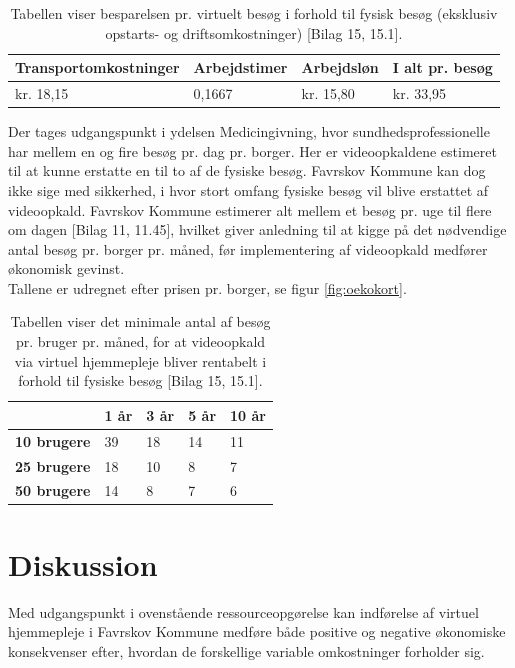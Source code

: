 \begin{table}[H]
	\caption{Tabellen viser besparelsen pr. virtuelt besøg i forhold til fysisk besøg (eksklusiv opstarts- og driftsomkostninger) [Bilag 15, 15.1].}
	\centering
	\label{tab:tabelbesparelse}
	\begin{tabular}{|l|l|l|l|}
		\hline
		\textbf{Transportomkostninger} & \textbf{Arbejdstimer } & \textbf{Arbejdsløn \cite{foa}} & \textbf{I alt pr. besøg}\\ \hline
		kr. 18,15 & 0,1667 & kr. 15,80 & kr. 33,95\\ \hline
	\end{tabular}
\end{table}

Der tages udgangspunkt i ydelsen Medicingivning, hvor sundhedsprofessionelle har mellem en og fire besøg pr. dag pr. borger. Her er videoopkaldene estimeret til at kunne erstatte en til to af de fysiske besøg. Favrskov Kommune kan dog ikke sige med sikkerhed, i hvor stort omfang fysiske besøg vil blive erstattet af videoopkald. Favrskov Kommune estimerer alt mellem et besøg pr. uge til flere om dagen [Bilag 11, 11.45], hvilket giver anledning til at kigge på det nødvendige antal besøg pr. borger pr. måned, før implementering af videoopkald medfører økonomisk gevinst.\\
Tallene er udregnet efter prisen pr. borger, se figur \ref{fig:oekokort}.

\begin{table}[H]
	\caption{Tabellen viser det minimale antal af besøg pr. bruger pr. måned, for at videoopkald via virtuel hjemmepleje bliver rentabelt i forhold til fysiske besøg [Bilag 15, 15.1].}
	\centering
	\label{tab:tabelminimum}
	\begin{tabular}{|l|l|l|l|l|}
		\hline
		 & \textbf{1 år} & \textbf{3 år} & \textbf{5 år} & \textbf{10 år}\\ \hline
		\textbf{10 brugere} & 39 & 18 & 14 & 11\\ \hline
		\textbf{25 brugere} & 18 & 10 & 8 & 7\\ \hline
		\textbf{50 brugere} & 14 & 8 & 7 & 6\\ \hline
	\end{tabular}
\end{table}

\section{Diskussion}
Med udgangspunkt i ovenstående ressourceopgørelse kan indførelse af virtuel hjemmepleje i Favrskov Kommune medføre både positive og negative økonomiske konsekvenser efter, hvordan de forskellige variable omkostninger forholder sig. 


